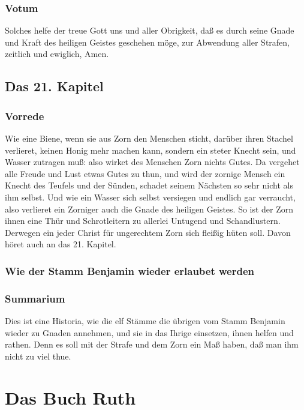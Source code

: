 \section{Votum}

Solches helfe der treue Gott uns und aller Obrigkeit, daß es durch seine Gnade und Kraft des heiligen Geistes geschehen möge, zur Abwendung aller Strafen, zeitlich und ewiglich, Amen.

\chapter{Das 21. Kapitel}

\section{Vorrede}

Wie eine Biene, wenn sie aus Zorn den Menschen sticht, darüber ihren Stachel verlieret, keinen Honig mehr machen kann, sondern ein steter Knecht sein, und Wasser zutragen muß: also wirket des Menschen Zorn nichts Gutes. Da vergehet alle Freude und Lust etwas Gutes zu thun, und wird der zornige Mensch ein Knecht des Teufels und der Sünden, schadet seinem Nächsten so sehr nicht als ihm selbst. Und wie ein Wasser sich selbst versiegen und endlich gar verraucht, also verlieret ein Zorniger auch die Gnade des heiligen Geistes. So ist der Zorn ihnen eine Thür und Schrotleitern zu allerlei Untugend und Schandlustern. Derwegen ein jeder Christ für ungerechtem Zorn sich fleißig hüten soll. Davon höret auch an das 21. Kapitel.

\section{Wie der Stamm Benjamin wieder erlaubet werden}
\section{Summarium}

Dies ist eine Historia, wie die elf Stämme die übrigen vom Stamm Benjamin wieder zu Gnaden annehmen, und sie in das Ihrige einsetzen, ihnen helfen und rathen. Denn es soll mit der Strafe und dem Zorn ein Maß haben, daß man ihm nicht zu viel thue.

\part{Das Buch Ruth}


